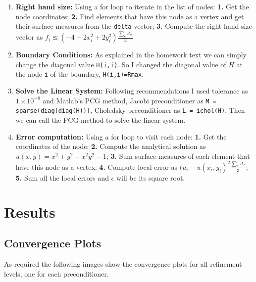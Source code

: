 \documentclass[a4paper, 11pt]{article}
\begin{document}
\begin{enumerate}
				\item  \textbf{Right hand size:}
					Using a for loop to iterate in the list of nodes:
					\subitem \textbf{1.} Get the node coordinates;
					\subitem \textbf{2.} Find elements that have this node as a vertex and get their surface measures from the \texttt{delta} vector;
					\subitem \textbf{3.} Compute the right hand size vector as $f_i \approxeq (-4 +2x_i^2 + 2y_i^2)  \frac{\sum_e \Delta_e}{3} $
				
				\item \textbf{Boundary Conditions:}
					As explained in the homework text we can simply change the diagonal value \texttt{H(i,i)}.
					So I changed the diagonal value of $ H $ at the node \texttt{i} of the boundary, \texttt{H(i,i)=Rmax}.
				
				\item \textbf{Solve the Linear System:}
					Following recommendations I used tolerance as $ 1 \times 10^{-8} $ and Matlab's PCG method, Jacobi preconditioner as \texttt{M = sparse(diag(diag(H)))}, Choledsky preconditioner as \texttt{L = ichol(H)}.
					Then we can call the PCG method to solve the linear system.
				
				\item \textbf{Error computation:} Using a for loop to visit each node:
					\subitem \textbf{1.} Get the coordinates of the node;
					\subitem \textbf{2.} Compute the analytical solution as $u(x,y) = x^2 + y^2 - x^2y^2 - 1$;
					\subitem \textbf{3.} Sum surface measures of each element that have this node as a vertex;
					\subitem \textbf{4.} Compute local error as $ (u_i - u(x_i,y_i)^ 2 \frac{\sum_e \Delta_e}{3} $;
					\subitem \textbf{5.} Sum all the local errors and $ \epsilon $ will be its square root.	
			\end{enumerate}
			
	
		
		\section{Results}
		
			\subsection{Convergence Plots}
			
				As required the following images show the convergence plots for all refinement levels, one for each preconditioner.
				
\end{document}
